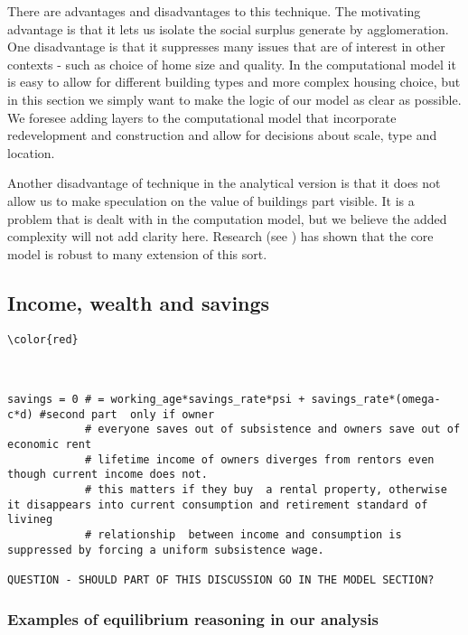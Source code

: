 {There are advantages and disadvantages to this technique. The motivating advantage is that it lets us isolate the social surplus generate by agglomeration. One disadvantage is that it suppresses many issues that are of interest in other contexts - such as choice of home size and quality. In the computational model it is easy to allow for different building types and more complex housing choice, but in this section we simply  want to make the logic of our model as clear as possible. We foresee adding layers to the computational model that incorporate redevelopment and construction and allow for decisions about scale, type and location. 

Another disadvantage of technique in the analytical version is that it does not allow us to make speculation on  the value of  buildings part visible. It is a problem that is dealt with in the computation model, but we believe the added complexity will not add clarity here. Research (see \cite{mcdonaldWilliamAlonsoRichard2007}) has shown  that the core model is robust to many extension of this sort. 

\subsection{Income, wealth and savings}
\begin{verbatim}\color{red}



savings = 0 # = working_age*savings_rate*psi + savings_rate*(omega-c*d) #second part  only if owner 
            # everyone saves out of subsistence and owners save out of economic rent 
            # lifetime income of owners diverges from rentors even though current income does not. 
            # this matters if they buy  a rental property, otherwise it disappears into current consumption and retirement standard of livineg
            # relationship  between income and consumption is suppressed by forcing a uniform subsistence wage.

QUESTION - SHOULD PART OF THIS DISCUSSION GO IN THE MODEL SECTION?
\end{verbatim}



\subsubsection{Examples of  \gls{equilibrium reasoning} in our analysis}

}
